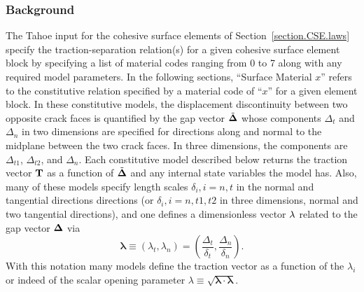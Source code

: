 \subsubsection{Background}
\label{sect.material.surface.common}

The Tahoe input for the cohesive surface elements of 
Section~\ref{section.CSE.laws} specify the traction-separation relation(s)
for a given cohesive surface element block by specifying a list of material
codes ranging from 0 to 7 along with any required model parameters. In
the following sections,  ``Surface Material $x$'' refers to the constitutive 
relation
specified by a material code of ``$x$'' for a given element block. 
In these constitutive models, the displacement discontinuity between two
opposite crack faces is quantified by the gap vector $\tilde{\bf{\Delta}}$
whose components $\Delta_t$ and $\Delta_n$ in two dimensions are specified
for directions along and normal to the midplane between the two crack
faces. In three dimensions, the components are $\Delta_{t1}$, $\Delta_{t2}$,
and $\Delta_n$. Each constitutive model described below returns the
traction vector $\bf{T}$ as a function of $\tilde{\bf{\Delta}}$ and any
internal state variables the model has.  Also, many of these models specify 
length scales $\delta_i, i = n,t$ in the normal and tangential directions
directions (or $\delta_i, i = n,t1,t2$ in three dimensions, normal and 
two tangential directions), and one defines a dimensionless vector
$\bf{\lambda}$ related to the gap vector $\bf{\Delta}$ via
\begin{equation}
\boldsymbol{\lambda} \equiv (\lambda_t,\lambda_n) 
= (\frac{\Delta_t}{\delta_t}, \frac{\Delta_n}{\delta_n}).
\end{equation}
With this notation many models define the traction
vector as a function of the $\lambda_i$ or indeed of the
scalar opening parameter $\lambda \equiv \sqrt{\boldsymbol{\lambda}
\cdot\boldsymbol{\lambda}}$.

